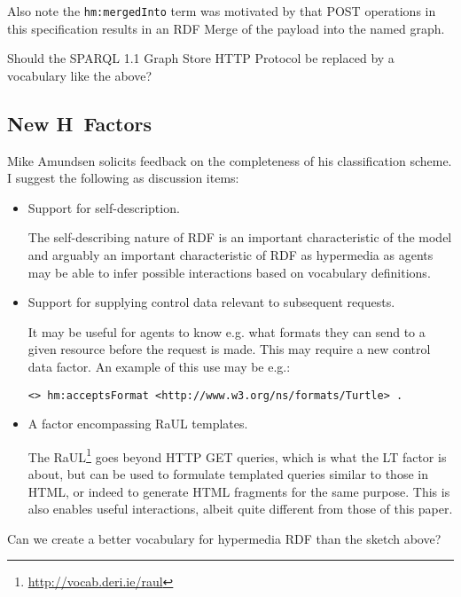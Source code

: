 \documentclass{llncs}
\begin{document}
Also note the \texttt{hm:mergedInto} term was motivated by that POST
operations in this specification results in an RDF Merge of the
payload into the named graph. 

\begin{question}
Should the SPARQL 1.1 Graph Store HTTP Protocol be replaced by a
vocabulary like the above?
\end{question}

\subsection{New H~Factors}

Mike Amundsen solicits feedback on the completeness of his
classification scheme. I suggest the following as discussion items:

\begin{itemize}

\item Support for self-description.

The self-describing nature of RDF is an important characteristic of
the model and arguably an important characteristic of RDF as
hypermedia as agents may be able to infer possible interactions based
on vocabulary definitions.

\item Support for supplying control data relevant to subsequent requests.

It may be useful for agents to know e.g. what formats they can send to
a given resource before the request is made. This may require a new
control data factor. An example of this use may be e.g.:

\begin{verbatim}
<> hm:acceptsFormat <http://www.w3.org/ns/formats/Turtle> .
\end{verbatim}

\item A factor encompassing RaUL templates. 

  The RaUL\footnote{\url{http://vocab.deri.ie/raul}} goes beyond HTTP
  GET queries, which is what the \textsf{LT} factor is about, but can
  be used to formulate templated queries similar to those in HTML, or
  indeed to generate HTML fragments for the same purpose. This is also
  enables useful interactions, albeit quite different from those of
  this paper.


\end{itemize}


\begin{question}
Can we create a better vocabulary for hypermedia RDF than the sketch above?
\end{question}
\end{document}
